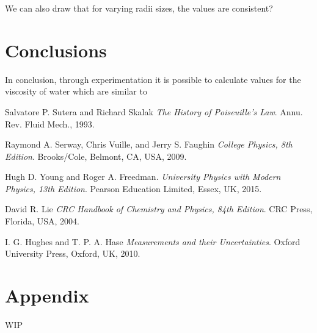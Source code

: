 \documentclass[twocolumn]{revtex4}
\begin{document}
We can also draw that for varying radii sizes, the values are consistent? 

\vspace{-5ex}
\section{Conclusions}
\vspace{-2ex}
 
In conclusion, through experimentation it is possible to calculate values for the viscosity of water which are similar to 

\begin{thebibliography}{5}
	Salvatore P. Sutera and Richard Skalak
	\textit{The History of Poiseuille's Law}.
	Annu. Rev. Fluid Mech., 1993.
	
	Raymond A. Serway, Chris Vuille, and Jerry S. Faughin
	\textit{College Physics, 8th Edition}.
	Brooks/Cole, Belmont, CA, USA, 2009.

	Hugh D. Young and Roger A. Freedman.
	\textit{University Physics with Modern Physics, 13th Edition}. 
	Pearson Education Limited, Essex, UK, 2015.
	
	David R. Lie
	\textit{CRC Handbook of Chemistry and Physics, 84th Edition}. 
	CRC Press, Florida, USA, 2004.
	
	I. G. Hughes and T. P. A. Hase
	\textit{Measurements and their Uncertainties}. 
	Oxford University Press, Oxford, UK, 2010.
	
\end{thebibliography}
\clearpage

\vfill
\twocolumngrid
\vspace{-3ex}
\section*{Appendix}
\vspace{-2ex}

WIP

\clearpage
\end{document}
